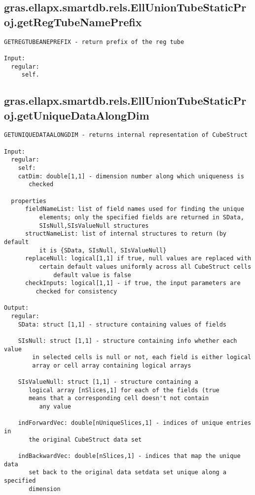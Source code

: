 \subsection{\texorpdfstring{gras.ellapx.smartdb.rels.EllUnionTubeStaticProj.getRegTubeNamePrefix}{getRegTubeNamePrefix}}\label{method:gras.ellapx.smartdb.rels.EllUnionTubeStaticProj.getRegTubeNamePrefix}
\begin{verbatim}
GETREGTUBEANEPREFIX - return prefix of the reg tube

Input:
  regular:
     self.
\end{verbatim}
\subsection{\texorpdfstring{gras.ellapx.smartdb.rels.EllUnionTubeStaticProj.getUniqueDataAlongDim}{getUniqueDataAlongDim}}\label{method:gras.ellapx.smartdb.rels.EllUnionTubeStaticProj.getUniqueDataAlongDim}
\begin{verbatim}
GETUNIQUEDATAALONGDIM - returns internal representation of CubeStruct

Input:
  regular:
    self:
    catDim: double[1,1] - dimension number along which uniqueness is
       checked

  properties
      fieldNameList: list of field names used for finding the unique
          elements; only the specified fields are returned in SData,
          SIsNull,SIsValueNull structures
      structNameList: list of internal structures to return (by default
          it is {SData, SIsNull, SIsValueNull}
      replaceNull: logical[1,1] if true, null values are replaced with
          certain default values uniformly across all CubeStruct cells
              default value is false
      checkInputs: logical[1,1] - if true, the input parameters are
         checked for consistency

Output:
  regular:
    SData: struct [1,1] - structure containing values of fields

    SIsNull: struct [1,1] - structure containing info whether each value
        in selected cells is null or not, each field is either logical
        array or cell array containing logical arrays

    SIsValueNull: struct [1,1] - structure containing a
       logical array [nSlices,1] for each of the fields (true
       means that a corresponding cell doesn't not contain
          any value

    indForwardVec: double[nUniqueSlices,1] - indices of unique entries in
       the original CubeStruct data set

    indBackwardVec: double[nSlices,1] - indices that map the unique data
       set back to the original data setdata set unique along a specified
       dimension
\end{verbatim}
